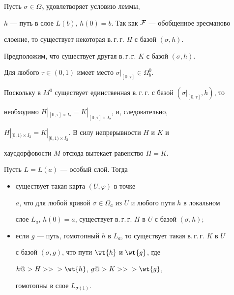 \begin{pf}


Пусть $\sigma\in \Omega_b$ удовлетворяет условию леммы,


$h$ --- путь в слое $L(b)$, $h(0){=}b$. Так как $\cal F$ ---  обобщенное эресманово


слоение, то существует некоторая в.\,г.\,г. $H$ с базой $(\sigma, h)$.


Предположим, что существует другая в.\,г.\,г. $K$ с базой $(\sigma, h)$.


Для любого $\tau\in(0,1)$ имеет место $\sigma|_{[0,\tau]}\in\Omega^0_b$.


Поскольку в $M^0$ существует единственная в.\,г.\,г. с базой $(\sigma|_{[0,\tau]},h)$, то


необходимо $H|_{[0,\tau]\times I_2}=K|_{[0,\tau]\times I_2}$, и, следовательно,


$H|_{[0,1)\times I_2}=K|_{[0,1)\times I_2}$. В силу непрерывности $H$ и $K$ и


хаусдорфовости $M$ отсюда вытекает равенство $H=K$.


\end{pf}





\begin{lem}\label{2}


Пусть $L=L(a)$ --- особый слой. Тогда


\begin{itemize}


\item[1)] существует такая карта $(U,\varphi)$ в точке


$a$, что для любой кривой $\sigma\in\Omega_a$ из $U$ и любого пути $h$ в локальном


слое $L_a$, $h(0)=a$, существует в.\,г.\,г. $H$ в $U$ с базой  $(\sigma, h);$


\item[2)] если $g$ --- путь, гомотопный $h$ в $L_a$, то существует такая в.\,г.\,г. $K$ в $U$


с базой  $(\sigma, g)$, что пути $\wt{h}$ и $\wt{g}$, где


$h@>H>>{} >\wt{h}$, $g@>K>>{} >\wt{g}$,


гомотопны в слое $L_{\sigma(1)}$.


\end{itemize}


\end{lem}





